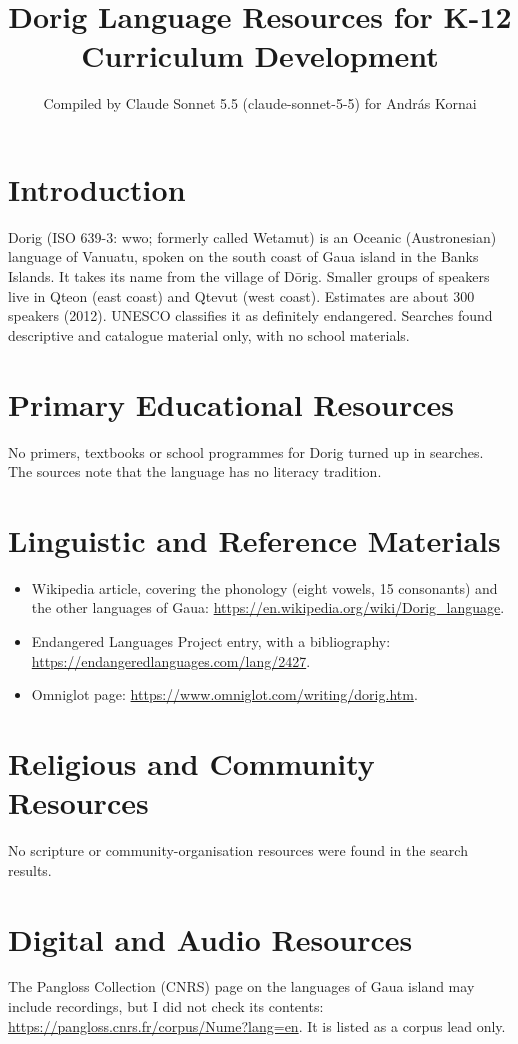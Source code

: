\documentclass[12pt]{article}
\title{Dorig Language Resources for K-12 Curriculum Development}
\author{Compiled by Claude Sonnet 5.5 (claude-sonnet-5-5) for Andr\'as Kornai}
\date{}
\begin{document}
\maketitle

\section{Introduction}
Dorig (ISO 639-3: wwo; formerly called Wetamut) is an Oceanic (Austronesian) language of Vanuatu, spoken on the south coast of Gaua island in the Banks Islands. It takes its name from the village of D\=orig. Smaller groups of speakers live in Qteon (east coast) and Qtevut (west coast). Estimates are about 300 speakers (2012). UNESCO classifies it as definitely endangered. Searches found descriptive and catalogue material only, with no school materials.

\section{Primary Educational Resources}
No primers, textbooks or school programmes for Dorig turned up in searches. The sources note that the language has no literacy tradition.

\section{Linguistic and Reference Materials}
\begin{itemize}
\item Wikipedia article, covering the phonology (eight vowels, 15 consonants) and the other languages of Gaua: \url{https://en.wikipedia.org/wiki/Dorig_language}.
\item Endangered Languages Project entry, with a bibliography: \url{https://endangeredlanguages.com/lang/2427}.
\item Omniglot page: \url{https://www.omniglot.com/writing/dorig.htm}.
\end{itemize}

\section{Religious and Community Resources}
No scripture or community-organisation resources were found in the search results.

\section{Digital and Audio Resources}
The Pangloss Collection (CNRS) page on the languages of Gaua island may include recordings, but I did not check its contents: \url{https://pangloss.cnrs.fr/corpus/Nume?lang=en}. It is listed as a corpus lead only.
\end{document}
